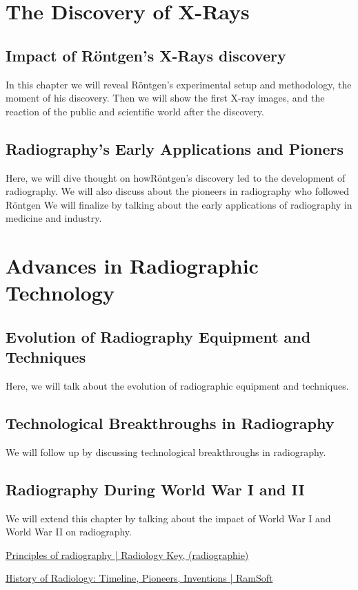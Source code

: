 \documentclass[a4paper,12pt]{report}
\begin{document}
\chapter{The Discovery of X-Rays}
\section{Impact of Röntgen's X-Rays discovery}
In this chapter we will reveal Röntgen's experimental setup and methodology, the moment of his discovery. Then we will show the first X-ray images, and the reaction of the public and scientific world after the discovery.
\section{Radiography's Early Applications and Pioners}
Here, we will dive thought on howRöntgen's discovery led to the development of radiography. We will also discuss about the pioneers in radiography who followed Röntgen We will finalize by talking about the early applications of radiography in medicine and industry.

\chapter{Advances  in Radiographic Technology}
\section{Evolution of Radiography Equipment and Techniques}
Here, we will talk about the evolution of radiographic equipment and techniques. 
\section{	Technological Breakthroughs in Radiography}
We will follow up by discussing technological breakthroughs in radiography. 
\section{Radiography During World War I and II}
We will extend this chapter by talking about the impact of World War I and World War II on radiography. 

\href{https://radiologykey.com/principles-of-radiography/}{Principles of radiography | Radiology Key, (radiographie) }

\href{https://www.ramsoft.com/history-of-radiology/}{History of Radiology: Timeline, Pioneers, Inventions | RamSoft  }
\end{document}

